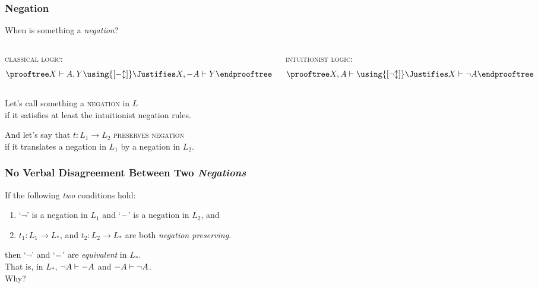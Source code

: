 \documentclass{beamer} %
\begin{document}
\begin{frame}\frametitle{Negation}
\begin{center}
When is something a \emph{negation}?
\end{center}
\begin{columns}\pause
\column{5cm}
\begin{center}
\textsc{classical logic:}
\[
\prooftree
X\vdash A,Y
\using{[\mathord{\cneg}\mathord{\updownarrow}]}\Justifies
X,\cneg A\vdash Y
\endprooftree
\]\pause
\end{center}
\column{5cm}
\begin{center}
\textsc{intuitionist logic:}
\[
\prooftree
X,A\vdash 
\using{[\mathord{\neg}\mathord{\updownarrow}]}\Justifies
X\vdash \neg A
\endprooftree
\]
\end{center}\pause
\end{columns}
\begin{center}
Let's call something a \textsc{negation} in $L$\\ if it satisfies at least the {intuitionist} negation rules.\\[6mm]\pause

And let's say that $t:L_1\to L_2$ \textsc{preserves negation}\\ if it translates a {negation} in $L_1$ by a {negation} in $L_2$.
\end{center}
\end{frame}

\begin{frame}\frametitle{No Verbal Disagreement Between Two \emph{Negations}}\large
If the following \emph{two} conditions hold:\\[1mm]\pause
\begin{enumerate}
\item `$\neg$' is a negation in $L_1$ and `$\mathord{-}$' is a negation in $L_2$, and\pause
\item $t_1:L_1\to L_*$, and $t_2:L_2\to L_*$ are both \emph{negation preserving}.\\[2mm]\pause
\end{enumerate}
then `$\neg$' and `$\mathord{-}$' are \emph{equivalent} in $L_*$.\\[2mm]\pause
That is, in $L_*$, $\neg A\vdash \mathord{-} A$ and $\mathord{-} A\vdash \neg A$.\\[6mm]\pause
Why?
\end{frame}
\end{document}
